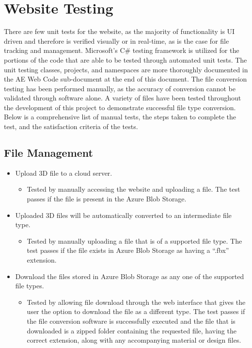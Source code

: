 
\section{Website Testing}
\tab There are few unit tests for the website, as the majority of functionality is UI driven and therefore is verified visually or in real-time, as is the case for file tracking and management. 
Microsoft's C\# testing framework is utilized for the portions of the code that are able to be tested through automated unit tests. 
The unit testing classes, projects, and namespaces are more thoroughly documented in the AE Web Code sub-document at the end of this document.
The file conversion testing has been performed manually, as the accuracy of conversion cannot be validated through software alone. 
A variety of files have been tested throughout the development of this project to demonstrate successful file type conversion.
Below is a comprehensive list of manual tests, the steps taken to complete the test, and the satisfaction criteria of the tests.

\subsection{File Management}
\begin{itemize}
    \item Upload 3D file to a cloud server.
    \begin{itemize}
        \item Tested by manually accessing the website and uploading a file. The test passes if the file is present in the Azure Blob Storage.
    \end{itemize}

    \item Uploaded 3D files will be automatically converted to an intermediate file type.
    \begin{itemize}
        \item Tested by manually uploading a file that is of a supported file type. The test passes if the file exists in Azure Blob Storage as having a ``.fbx'' extension.
    \end{itemize}

    \item Download the files stored in Azure Blob Storage as any one of the supported file types.
    \begin{itemize}
        \item Tested by allowing file download through the web interface that gives the user the option to download the file as a different type. The test passes if the file conversion software is successfully executed and the file that is downloaded is a zipped folder containing the requested file, having the correct extension, along with any accompanying material or design files.
    \end{itemize}

\end{itemize}


